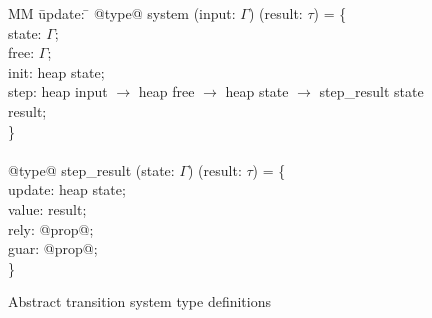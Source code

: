 
\begin{figure}
  \begin{tabbing}
  MM \= update: \= \kill
  @type@ system (input: $\Gamma$) (result: $\tau$) = \{ \\
  \> state:  \> $\Gamma$; \\
  \> free: \> $\Gamma$; \\
  \> init: \> heap state; \\
  \> step: \> heap input $\to$ heap free $\to$ heap state $\to$ step_result state result; \\
  \} \\
  \\
  @type@ step_result (state: $\Gamma$) (result: $\tau$) = \{ \\
  \> update:  \> heap state; \\
  \> value: \> result; \\
  \> rely: \> @prop@; \\
  \> guar: \> @prop@; \\
  \}
  \end{tabbing}
  \caption{Abstract transition system type definitions}
  \label{f:system-types}
\end{figure}